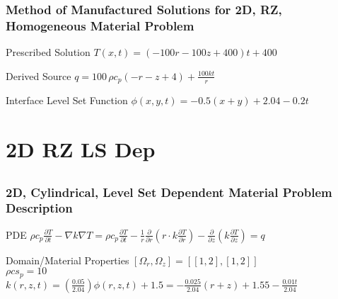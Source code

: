 \documentclass[]{beamer}
\begin{document}
\begin{frame}[t]\frametitle{Method of Manufactured Solutions for 2D, RZ, Homogeneous Material Problem}
  \begin{block}{Prescribed Solution}
    $T(x,t) = (-100r-100z+400)t + 400$
  \end{block}
  
  \begin{block}{Derived Source}
  $q = 100\,\rho c_p \left(-r-z+4\right)+\frac{100kt}{r}$
  \end{block}
  
  \begin{block}{Interface Level Set Function}
    $\phi(x,y,t) = -0.5(x+y) + 2.04 - 0.2t$
  \end{block}
\end{frame}


\section{2D RZ LS Dep}
\subsection{}
\begin{frame}[t]\frametitle{2D, Cylindrical, Level Set Dependent Material Problem Description}
  \begin{block}{PDE}
    $\rho c_p\frac{\partial T}{\partial t} - \nabla k \nabla T = 
    \rho c_p\frac{\partial T}{\partial t} - \frac{1}{r}\frac{\partial}{\partial r}
    \left(r\cdot k\frac{\partial T}{\partial r}\right) - \frac{\partial}{\partial z}
    \left(k\frac{\partial T}{\partial z}\right)= q$
  \end{block}
  
  \begin{block}{Domain/Material Properties}
  	$[\Omega_r,\Omega_z] = [[1,2],[1,2]]$ \\
  	$\rho cs_p = 10$ \\
  	$k(r,z,t) = \left(\frac{0.05}{2.04}\right) \phi(r,z,t) + 1.5 = 
  	-\frac{0.025}{2.04}(r+z) + 1.55 - \frac{0.01t}{2.04}$
  \end{block}
\end{frame}
\end{document}
